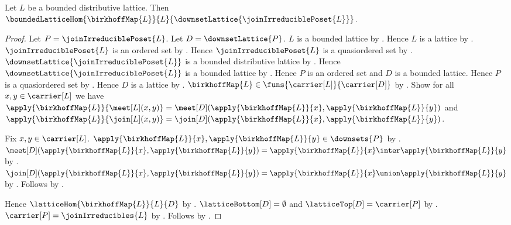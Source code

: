\begin{theorem}\label{birkhoff_map_is_bounded_lattice_hom}
    Let $L$ be a bounded distributive lattice.
    Then $\boundedLatticeHom
        {\birkhoffMap{L}}{L}
        {\downsetLattice{\joinIrreduciblePoset{L}}}$.
\end{theorem}
\begin{proof}
    Let $P=\joinIrreduciblePoset{L}$.
    Let $D=\downsetLattice{P}$.
    $L$ is a bounded lattice by .
    Hence $L$ is a lattice by .
    $\joinIrreduciblePoset{L}$ is an ordered set by
        .
    Hence $\joinIrreduciblePoset{L}$ is a quasiordered set by
        .
    $\downsetLattice{\joinIrreduciblePoset{L}}$ is a bounded
        distributive lattice by
        .
    Hence $\downsetLattice{\joinIrreduciblePoset{L}}$ is a bounded
        lattice by
        .
    Hence $P$ is an ordered set and $D$ is a bounded lattice.
    Hence $P$ is a quasiordered set by .
    Hence $D$ is a lattice by .
    $\birkhoffMap{L}\in\funs{\carrier[L]}{\carrier[D]}$ by
        .
    Show for all $x,y\in\carrier[L]$ we have
        $\apply{\birkhoffMap{L}}{\meet[L](x,y)}
            =\meet[D](\apply{\birkhoffMap{L}}{x},\apply{\birkhoffMap{L}}{y})$ and
        $\apply{\birkhoffMap{L}}{\join[L](x,y)}
            =\join[D](\apply{\birkhoffMap{L}}{x},\apply{\birkhoffMap{L}}{y})$.
    \begin{subproof}
        Fix $x,y\in\carrier[L]$.
        $\apply{\birkhoffMap{L}}{x},\apply{\birkhoffMap{L}}{y}\in\downsets{P}$ by
            .
        $\meet[D](\apply{\birkhoffMap{L}}{x},\apply{\birkhoffMap{L}}{y})
            =\apply{\birkhoffMap{L}}{x}\inter\apply{\birkhoffMap{L}}{y}$ by
            .
        $\join[D](\apply{\birkhoffMap{L}}{x},\apply{\birkhoffMap{L}}{y})
            =\apply{\birkhoffMap{L}}{x}\union\apply{\birkhoffMap{L}}{y}$ by
            .
        Follows by .
    \end{subproof}
    Hence $\latticeHom{\birkhoffMap{L}}{L}{D}$ by
        .
    $\latticeBottom[D]=\emptyset$ and
        $\latticeTop[D]=\carrier[P]$ by
        .
    $\carrier[P]=\joinIrreducibles{L}$ by
        .
    Follows by
        .
\end{proof}

